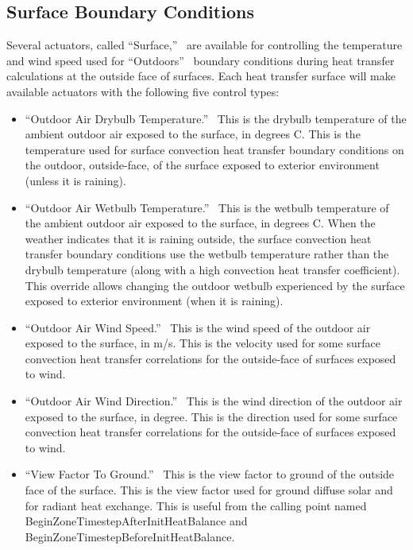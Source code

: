 \subsection{Surface Boundary Conditions}\label{surface-boundary-conditions}

Several actuators, called ``Surface,''~ are available for controlling the temperature and wind speed used for ``Outdoors''~ boundary conditions during heat transfer calculations at the outside face of surfaces. Each heat transfer surface will make available actuators with the following five control types:

\begin{itemize}
\item
  ``Outdoor Air Drybulb Temperature.''~ This is the drybulb temperature of the ambient outdoor air exposed to the surface, in degrees C. This is the temperature used for surface convection heat transfer boundary conditions on the outdoor, outside-face, of the surface exposed to exterior environment (unless it is raining).
\item
  ``Outdoor Air Wetbulb Temperature.''~ This is the wetbulb temperature of the ambient outdoor air exposed to the surface, in degrees C. When the weather indicates that it is raining outside, the surface convection heat transfer boundary conditions use the wetbulb temperature rather than the drybulb temperature (along with a high convection heat transfer coefficient). This override allows changing the outdoor wetbulb experienced by the surface exposed to exterior environment (when it is raining).
\item
  ``Outdoor Air Wind Speed.''~ This is the wind speed of the outdoor air exposed to the surface, in m/s. This is the velocity used for some surface convection heat transfer correlations for the outside-face of surfaces exposed to wind.
\item
  ``Outdoor Air Wind Direction.''~ This is the wind direction of the outdoor air exposed to the surface, in degree. This is the direction used for some surface convection heat transfer correlations for the outside-face of surfaces exposed to wind.
\item
  ``View Factor To Ground.''~ This is the view factor to ground of the outside face of the surface. This is the view factor used for ground diffuse solar and for radiant heat exchange. This is useful from the calling point named BeginZoneTimestepAfterInitHeatBalance and BeginZoneTimestepBeforeInitHeatBalance.
\end{itemize}

